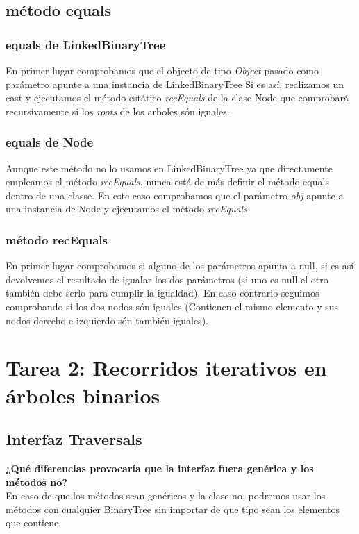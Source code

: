 \documentclass{article}
\begin{document}
    \subsection{método equals}
    \subsubsection{equals de LinkedBinaryTree}
    En primer lugar comprobamos que el objecto de tipo \textit{Object} pasado como parámetro apunte a una instancia de LinkedBinaryTree
    Si es así, realizamos un cast y ejecutamos el método estático \textit{recEquals} de la clase Node que comprobará recursivamente si los \textit{roots} de los arboles són iguales.
    \subsubsection{equals de Node}
    Aunque este método no lo usamos en LinkedBinaryTree ya que directamente empleamos el método \textit{recEquals}, nunca está de más definir el método equals dentro de una classe.
    En este caso comprobamos que el parámetro \textit{obj} apunte a una instancia de Node y
    ejecutamos el método \textit{recEquals}
    \subsubsection{método recEquals}
    En primer lugar comprobamos si alguno de los parámetros apunta a null, si es así devolvemos el resultado de igualar los dos parámetros (si uno es null el otro también debe serlo para cumplir la igualdad).
    En caso contrario seguimos comprobando si los dos nodos són iguales (Contienen el mismo elemento y sus nodos derecho e izquierdo són también iguales).
    \newline

    \section{Tarea 2: Recorridos iterativos en árboles binarios}

    \subsection{Interfaz Traversals}
    \textbf{ ¿Qué diferencias provocaría que la interfaz fuera genérica y los
    métodos no?}\\
    En caso de que los métodos sean genéricos y la clase no, podremos usar los métodos con cualquier BinaryTree sin importar de que tipo sean los elementos que contiene.
\end{document}
